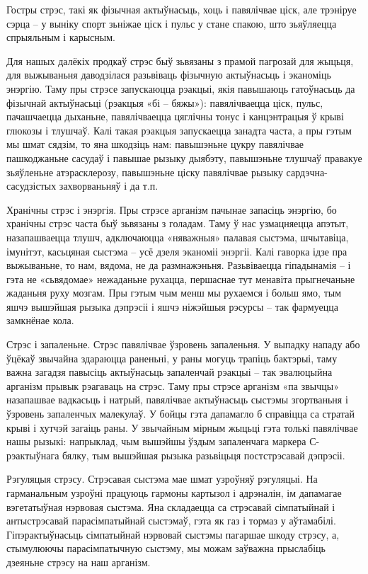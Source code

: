 Гостры стрэс, такі як фізычная актыўнасьць, хоць і павялічвае ціск, але трэніруе сэрца – у выніку спорт зьніжае ціск і пульс у стане спакою, што зьяўляецца спрыяльным і карысным.

Для нашых далёкіх продкаў стрэс быў зьвязаны з прамой пагрозай для жыцьця, для выжываньня даводзілася разьвіваць фізычную актыўнасьць і эканоміць энэргію. Таму пры стрэсе запускаюцца рэакцыі, якія павышаюць гатоўнасьць да фізычнай актыўнасьці (рэакцыя «бі – бяжы»): павялічваецца ціск, пульс, пачашчаецца дыханьне, павялічваецца цяглічны тонус і канцэнтрацыя ў крыві глюкозы і тлушчаў. Калі такая рэакцыя запускаецца занадта часта, а пры гэтым мы шмат сядзім, то яна шкодзіць нам: павышэньне цукру павялічвае пашкоджаньне сасудаў і павышае рызыку дыябэту, павышэньне тлушчаў правакуе зьяўленьне атэрасклерозу, павышэньне ціску павялічвае рызыку сардэчна-сасудзістых захворваньняў і да т.п.

Хранічны стрэс і энэргія. Пры стрэсе арганізм пачынае запасіць энэргію, бо хранічны стрэс часта быў зьвязаны з голадам. Таму ў нас узмацняецца апэтыт, назапашваецца тлушч, адключаюцца «няважныя» палавая сыстэма, шчытавіца, імунітэт, касьцяная сыстэма – усё дзеля эканоміі энэргіі. Калі гаворка ідзе пра выжываньне, то нам, вядома, не да размнажэньня. Разьвіваецца гіпадынамія – і гэта не «сьвядомае» нежаданьне рухацца, першаснае тут менавіта прыгнечаньне жаданьня руху мозгам. Пры гэтым чым менш мы рухаемся і больш ямо, тым яшчэ вышэйшая рызыка дэпрэсіі і яшчэ ніжэйшыя рэсурсы – так фармуецца замкнёнае кола.

Стрэс і запаленьне. Стрэс павялічвае ўзровень запаленьня. У выпадку нападу або ўцёкаў звычайна здараюцца раненьні, у раны могуць трапіць бактэрыі, таму важна загадзя павысіць актыўнасьць запаленчай рэакцыі – так эвалюцыйна арганізм прывык рэагаваць на стрэс. Таму пры стрэсе арганізм «па звычцы» назапашвае вадкасьць і натрый, павялічвае актыўнасьць сыстэмы згортваньня і ўзровень запаленчых малекулаў. У бойцы гэта дапамагло б справіцца са стратай крыві і хутчэй загаіць раны. У звычайным мірным жыцьці гэта толькі павялічвае нашы рызыкі: напрыклад, чым вышэйшы ўздым запаленчага маркера С-рэактыўнага бялку, тым вышэйшая рызыка разьвіцьця постстрэсавай дэпрэсіі.

Рэгуляцыя стрэсу. Стрэсавая сыстэма мае шмат узроўняў рэгуляцыі. На гарманальным узроўні працуюць гармоны картызол і адрэналін, ім дапамагае вэгетатыўная нэрвовая сыстэма. Яна складаецца са стрэсавай сімпатыйнай і антыстрэсавай парасімпатыйнай сыстэмаў, гэта як газ і тормаз у аўтамабілі. Гіпэрактыўнасьць сімпатыйнай нэрвовай сыстэмы пагаршае шкоду стрэсу, а, стымулюючы парасімпатычную сыстэму, мы можам заўважна прыслабіць дзеяньне стрэсу на наш арганізм.

